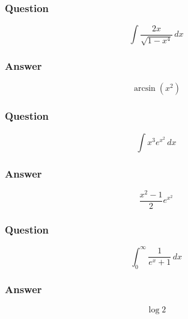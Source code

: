 \documentclass[12pt, t]{beamer}
\begin{document}
\begin{frame}
    \frametitle{Question}
    \vfill 
    \begin{Large}
        \begin{equation*}
            \int \frac{2x}{\sqrt{1 - x^4}}\,dx
        \end{equation*}
    \end{Large}
    \vfill
\end{frame}

\begin{frame}
    \frametitle{Answer}
    \vfill
    \begin{Large}
        \begin{equation*}
            \arcsin (x^2)
        \end{equation*}
    \end{Large}
    \vfill
\end{frame}

\begin{frame}
    \frametitle{Question}
    \vfill
    \begin{Large}
        \begin{equation*}
            \int x^3 e^{x^2}\,dx
        \end{equation*}    
    \end{Large}
    \vfill
\end{frame}

\begin{frame}
    \frametitle{Answer}
    \vfill
    \begin{Large}
        \begin{equation*}
            \frac{x^2 - 1}{2}e^{x^2}
        \end{equation*}    
    \end{Large}
    \vfill
\end{frame}

\begin{frame}
    \frametitle{Question}
    \vfill
    \begin{Large}
        \begin{equation*}
            \int^\infty_0 \frac{1}{e^x + 1}\,dx
        \end{equation*}    
    \end{Large}
    \vfill
\end{frame}

\begin{frame}
    \frametitle{Answer}
    \vfill
    \begin{Large}
        \begin{equation*}
            \log 2
        \end{equation*}    
    \end{Large}
    \vfill
\end{frame}
\end{document}

